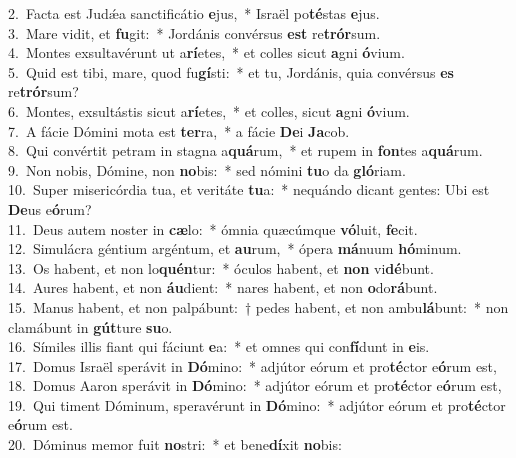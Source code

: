 {2.~}Facta est Judǽa sanctificátio \textbf{e}jus,~* Israël po\textbf{té}stas \textbf{e}jus.\\
{3.~}Mare vidit, et \textbf{fu}git:~* Jordánis convérsus \textbf{est} re\textbf{trór}sum.\\
{4.~}Montes exsultavérunt ut a\textbf{rí}etes,~* et colles sicut \textbf{a}gni \textbf{ó}vium.\\
{5.~}Quid est tibi, mare, quod fu\textbf{gí}sti:~* et tu, Jordánis, quia convérsus \textbf{es} re\textbf{trór}sum?\\
{6.~}Montes, exsultástis sicut a\textbf{rí}etes,~* et colles, sicut \textbf{a}gni \textbf{ó}vium.\\
{7.~}A fácie Dómini mota est \textbf{ter}ra,~* a fácie \textbf{De}i \textbf{Ja}cob.\\
{8.~}Qui convértit petram in stagna a\textbf{quá}rum,~* et rupem in \textbf{fon}tes a\textbf{quá}rum.\\
{9.~}Non nobis, Dómine, non \textbf{no}bis:~* sed nómini \textbf{tu}o da \textbf{gló}riam.\\
{10.~}Super misericórdia tua, et veritáte \textbf{tu}a:~* nequándo dicant gentes: Ubi est \textbf{De}us e\textbf{ó}rum?\\
{11.~}Deus autem noster in \textbf{cæ}lo:~* ómnia quæcúmque \textbf{vó}luit, \textbf{fe}cit.\\
{12.~}Simulácra géntium argéntum, et \textbf{au}rum,~* ópera \textbf{má}nuum \textbf{hó}minum.\\
{13.~}Os habent, et non lo\textbf{quén}tur:~* óculos habent, et \textbf{non} vi\textbf{dé}bunt.\\
{14.~}Aures habent, et non \textbf{áu}dient:~* nares habent, et non \textbf{o}do\textbf{rá}bunt.\\
{15.~}Manus habent, et non palpábunt:~† pedes habent, et non ambu\textbf{lá}bunt:~* non clamábunt in \textbf{gút}ture \textbf{su}o.\\
{16.~}Símiles illis fiant qui fáciunt \textbf{e}a:~* et omnes qui con\textbf{fí}dunt in \textbf{e}is.\\
{17.~}Domus Israël sperávit in \textbf{Dó}mino:~* adjútor eórum et pro\textbf{té}ctor e\textbf{ó}rum est,\\
{18.~}Domus Aaron sperávit in \textbf{Dó}mino:~* adjútor eórum et pro\textbf{té}ctor e\textbf{ó}rum est,\\
{19.~}Qui timent Dóminum, speravérunt in \textbf{Dó}mino:~* adjútor eórum et pro\textbf{té}ctor e\textbf{ó}rum est.\\
{20.~}Dóminus memor fuit \textbf{no}stri:~* et bene\textbf{dí}xit \textbf{no}bis:\\
